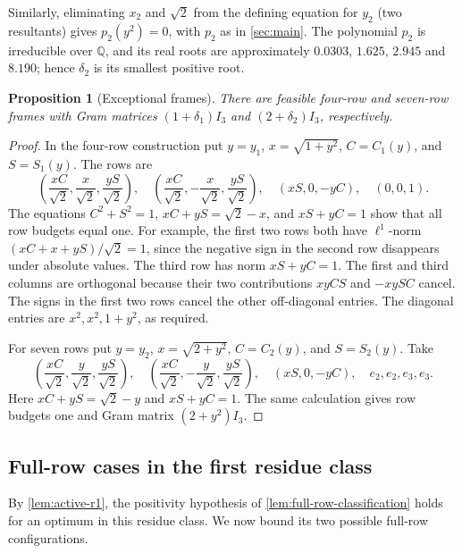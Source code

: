 \documentclass[11pt]{article}
\numberwithin{equation}{section}
\newtheorem{proposition}[proposition]{Proposition}
\theoremstyle{definition}
\theoremstyle{definition}
\begin{document}
Similarly, eliminating $x_2$ and $\sqrt2$ from the defining equation
for $y_2$ (two resultants) gives $p_2(y^2)=0$, with $p_2$ as in
\cref{sec:main}. The polynomial $p_2$ is irreducible over $\mathbb Q$,
and its real roots are approximately
$0.0303$, $1.625$, $2.945$ and $8.190$; hence $\delta_2$ is its
smallest positive root.


\begin{proposition}[Exceptional frames]
\label{prop:exceptional-frames}
There are feasible four-row and seven-row frames with Gram matrices
$(1+\delta_1)I_3$ and $(2+\delta_2)I_3$, respectively.
\end{proposition}
\begin{proof}
In the four-row construction put $y=y_1$, $x=\sqrt{1+y^2}$,
$C=C_1(y)$, and $S=S_1(y)$.  The rows are
\begin{equation}
 \left(\frac{xC}{\sqrt2},\frac{x}{\sqrt2},\frac{yS}{\sqrt2}\right),\quad
 \left(\frac{xC}{\sqrt2},-\frac{x}{\sqrt2},\frac{yS}{\sqrt2}\right),\quad
 (xS,0,-yC),\quad (0,0,1).
 \label{eq:four-frame}
\end{equation}
The equations $C^2+S^2=1$,
$xC+yS=\sqrt2-x$, and $xS+yC=1$ show that all row budgets equal one.
For example, the first two rows both have $\ell^1$-norm
$(xC+x+yS)/\sqrt2=1$, since the negative sign in the second row
disappears under absolute values.  The third row has norm
$xS+yC=1$.  The first and third columns are orthogonal because their two
contributions $xyCS$ and $-xySC$ cancel.  The signs in the first two
rows cancel the other off-diagonal entries.  The diagonal entries are
$x^2,x^2,1+y^2$, as required.

For seven rows put $y=y_2$, $x=\sqrt{2+y^2}$,
$C=C_2(y)$, and $S=S_2(y)$.  Take
\begin{equation}
 \left(\frac{xC}{\sqrt2},\frac{y}{\sqrt2},\frac{yS}{\sqrt2}\right),\quad
 \left(\frac{xC}{\sqrt2},-\frac{y}{\sqrt2},\frac{yS}{\sqrt2}\right),\quad
 (xS,0,-yC),\quad e_2,e_2,e_3,e_3.
 \label{eq:seven-frame}
\end{equation}
Here $xC+yS=\sqrt2-y$ and $xS+yC=1$.  The same calculation gives row
budgets one and Gram matrix $(2+y^2)I_3$.
\end{proof}

\subsection{Full-row cases in the first residue class}
By \cref{lem:active-r1}, the positivity hypothesis of
\cref{lem:full-row-classification} holds for an optimum in this
residue class. We now bound its two possible full-row configurations.
\end{document}
